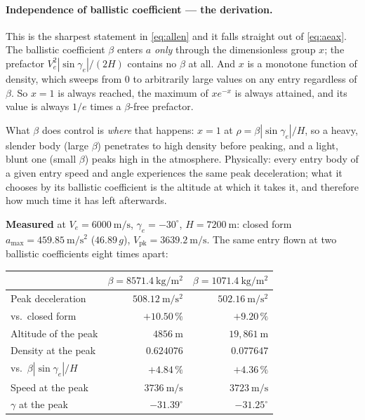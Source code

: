 \documentclass[11pt]{article}
\begin{document}
\paragraph{Independence of ballistic coefficient --- the derivation.}
This is the sharpest statement in \eqref{eq:allen} and it falls straight out of
\eqref{eq:aeax}. The ballistic coefficient $\beta$ enters $a$ \emph{only}
through the dimensionless group $x$; the prefactor $V_e^2|\sin\gamma_e|/(2H)$
contains no $\beta$ at all. And $x$ is a monotone function of density, which
sweeps from $0$ to arbitrarily large values on any entry regardless of $\beta$.
So $x=1$ is always reached, the maximum of $xe^{-x}$ is always attained, and
its value is always $1/e$ times a $\beta$-free prefactor.

What $\beta$ does control is \emph{where} that happens: $x=1$ at
$\rho = \beta|\sin\gamma_e|/H$, so a heavy, slender body (large $\beta$)
penetrates to high density before peaking, and a light, blunt one (small
$\beta$) peaks high in the atmosphere. Physically: every entry body of a given
entry speed and angle experiences the same peak deceleration; what it chooses
by its ballistic coefficient is the altitude at which it takes it, and
therefore how much time it has left afterwards.

\textbf{Measured} at $V_e = 6000~\mathrm{m/s}$, $\gamma_e = -30^{\circ}$,
$H=7200~\mathrm{m}$: closed form $a_{\max} = 459.85~\mathrm{m/s^2}$
($46.89\,g$), $V_{\text{pk}} = 3639.2~\mathrm{m/s}$. The same entry flown at
two ballistic coefficients eight times apart:

\begin{center}
\begin{tabular}{lrr}
\toprule
& $\beta = 8571.4~\mathrm{kg/m^2}$ & $\beta = 1071.4~\mathrm{kg/m^2}$ \\
\midrule
Peak deceleration           & $508.12~\mathrm{m/s^2}$ & $502.16~\mathrm{m/s^2}$ \\
\quad vs.\ closed form      & $+10.50\,\%$            & $+9.20\,\%$ \\
Altitude of the peak        & $4856~\mathrm{m}$       & $19{,}861~\mathrm{m}$ \\
Density at the peak         & $0.624076$              & $0.077647$ \\
\quad vs.\ $\beta|\sin\gamma_e|/H$ & $+4.84\,\%$      & $+4.36\,\%$ \\
Speed at the peak           & $3736~\mathrm{m/s}$     & $3723~\mathrm{m/s}$ \\
$\gamma$ at the peak        & $-31.39^{\circ}$        & $-31.25^{\circ}$ \\
\bottomrule
\end{tabular}
\end{center}
\end{document}

